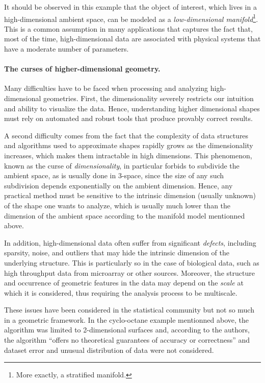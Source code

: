 It should be observed in this example  that the object of interest, which lives in a high-dimensional ambient space,  can be modeled as a {\em low-dimensional manifold}\footnote{More exactly, a stratified manifold.}. This is a common assumption  in many applications  that captures the fact that, most of the time, high-dimensional data are associated with physical systems that have a moderate number of  parameters.

\paragraph{The curses of higher-dimensional geometry.} 
Many difficulties have to be faced when processing and analyzing
high-dimensional geometries. First, the dimensionality severely restricts our intuition and ability to visualize the data. Hence,  understanding higher dimensional shapes must rely on automated and robust tools that produce provably correct results.

A second difficulty comes from the fact that the complexity of data structures and algorithms used to  approximate shapes  rapidly grows as the dimensionality increases, which makes them intractable in high dimensions.  This phenomenon, known as the curse of {\em dimensionality}, 
in particular forbids to subdivide the ambient space, as is usually done in 3-space, since the size of any such subdivision depends exponentially on the ambient dimension.  Hence, any practical method must be sensitive to the intrinsic dimension (usually unknown) of the shape one wants to analyze, which is usually much lower than the dimension of the ambient space according to the 
manifold model mentionned above.

In addition, high-dimensional data often suffer from significant {\em defects}, including sparsity, noise, and outliers that may hide the intrinsic dimension of the underlying structure. This is particularly so in the case of biological data, such as high throughput data from microarray or other sources. Moreover, the structure and occurrence of geometric features in the data may depend on the {\em scale} at which it is considered, thus requiring the analysis process to be multiscale.  

These issues have been considered in the statistical community but not so much in a geometric framework. In the cyclo-octane example mentionned above, the algorithm was limited to 2-dimensional surfaces and, according to the authors, the algorithm ``offers no theoretical guarantees of accuracy or correctness'' and dataset error and unusual distribution of data were not considered.

